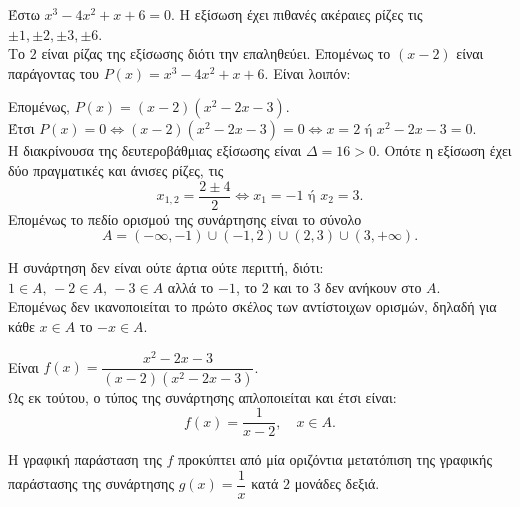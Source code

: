 \begin{alist}
\item Έστω $x^3 - 4x^2 + x + 6 = 0$. Η εξίσωση έχει πιθανές ακέραιες ρίζες τις $\pm 1, \pm 2, \pm 3, \pm 6$. \\
Το $2$ είναι ρίζας της εξίσωσης διότι την επαληθεύει. Επομένως το $(x - 2)$ είναι παράγοντας του $P(x) = x^3 - 4x^2 + x + 6$. Είναι λοιπόν:
\begin{center}
\end{center}
Επομένως, $P(x) = (x - 2)(x^2 - 2x - 3)$. \\
Έτσι $P(x) = 0 \Leftrightarrow (x - 2)(x^2 - 2x - 3) = 0 \Leftrightarrow x = 2 \text{ ή } x^2 - 2x - 3 = 0$. \\
Η διακρίνουσα της δευτεροβάθμιας εξίσωσης είναι $\Delta = 16 > 0$. Οπότε η εξίσωση έχει δύο πραγματικές και άνισες ρίζες, τις
\[x_{1,2} = \frac{2 \pm 4}{2} \Leftrightarrow x_1 = -1 \text{ ή } x_2 = 3.\]
Επομένως το πεδίο ορισμού της συνάρτησης είναι το σύνολο
\[A = (-\infty, -1) \cup (-1, 2) \cup (2, 3) \cup (3, +\infty).\]
\item Η συνάρτηση δεν είναι ούτε άρτια ούτε περιττή, διότι: \\
$1 \in A, \, -2 \in A, \, -3 \in A$ αλλά το $-1$, το $2$ και το $3$ δεν ανήκουν στο $A$. \\
Επομένως δεν ικανοποιείται το πρώτο σκέλος των αντίστοιχων ορισμών, δηλαδή για κάθε $x \in A$ το $-x \in A$.
\item 
\begin{rlist}
\item Είναι $f(x) = \dfrac{x^2 - 2x - 3}{(x - 2)(x^2 - 2x - 3)}$. \\
Ως εκ τούτου, ο τύπος της συνάρτησης απλοποιείται και έτσι είναι:
\[f(x) = \frac{1}{x - 2}, \quad x \in A.\]
\item Η γραφική παράσταση της $f$ προκύπτει από μία οριζόντια μετατόπιση της γραφικής παράστασης της συνάρτησης $g(x) = \dfrac{1}{x}$ κατά $2$ μονάδες δεξιά.
\end{rlist}
\end{alist}

